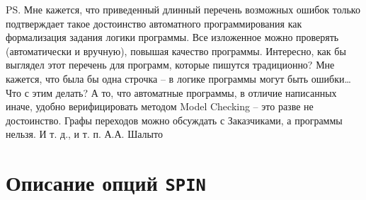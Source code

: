 \documentclass[12pt, twoside]{report}
\begin{document}
PS. Мне кажется, что приведенный длинный перечень возможных ошибок только подтверждает такое достоинство 
автоматного программирования как формализация задания логики программы. Все изложенное можно 
проверять (автоматически и вручную), повышая качество программы. Интересно, как бы выглядел этот 
перечень для программ, которые пишутся традиционно? Мне кажется, что была бы одна строчка – в логике 
программы могут быть ошибки… Что с этим делать? А то, что автоматные программы, в отличие написанных 
иначе, удобно верифицировать методом Model Checking – это разве не достоинство. Графы переходов можно 
обсуждать с Заказчиками, а программы нельзя. И т. д., и т. п. А.А. Шалыто

\newpage
\section*{Описание опций \texttt{SPIN}}\label{spin_quick_REFERENCE}


\end{document}

